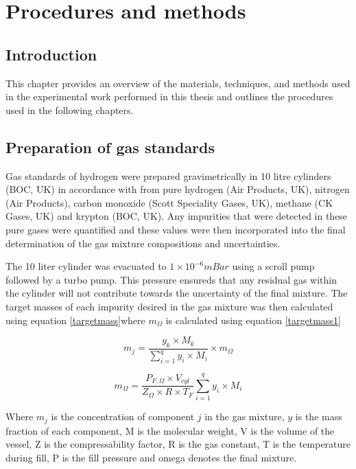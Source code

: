 \chapter{Procedures and methods}
\section{Introduction}
This chapter provides an overview of the materials, techniques, and methods used in the experimental work performed in this thesis and outlines the procedures used in the following chapters. 

\section{Preparation of gas standards} \label{gasprep}
Gas standards of hydrogen were prepared gravimetrically in 10 litre cylinders (BOC, UK) in accordance with \cite{InternationalStandardISO6142-1:2015} from pure hydrogen (Air Products, UK), nitrogen (Air Products), carbon monoxide (Scott Speciality Gases, UK), methane (CK Gases, UK) and krypton (BOC, UK). Any impurities that were detected in these pure gases were quantified and these values were then incorporated into the final determination of the gas mixture compositions and uncertainties. 

The 10 liter cylinder was evacuated to $1 \times 10^{-6} mBar$ using a scroll pump followed by a turbo pump. This pressure ensureds that any residual gas within the cylinder will not contribute towards the uncertainty of the final mixture. \cite{InternationalStandardISO6142-1:2015} The target masses of each impurity desired in the gas mixture was then calculated using equation \ref{targetmass}where $m_\Omega$ is calculated using equation \ref{targetmass1}

\begin{equation}\label{targetmass} 
  m_j = \frac{y_k \times M_k}{\sum_{i=1}^{q}y_i \times M_i}\times m_\Omega
\end{equation}

\begin{equation}\label{targetmass1}
  m_\Omega = \frac{P_{F, \Omega} \times V_{cyl}}{Z_\Omega \times R \times T_F}\sum_{i=1}^{q}y_i \times M_i
\end{equation}

Where $m_j$ is the concentration of component $j$ in the gas mixture, $y$ is the mass fraction of each component, M is the molecular weight, V is the volume of the vessel, Z is the compressability factor, R is the gas constant, T is the temperature during fill, P is the fill pressure and omega denotes the final mixture.

